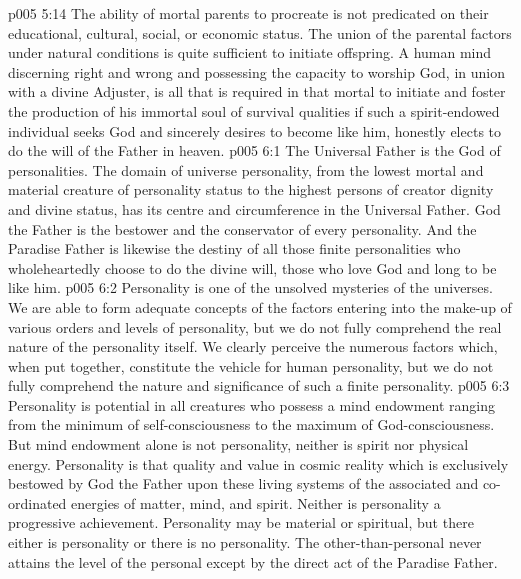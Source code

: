 \vs p005 5:14 The ability of mortal parents to procreate is not predicated on their educational, cultural, social, or economic status. The union of the parental factors under natural conditions is quite sufficient to initiate offspring. A human mind discerning right and wrong and possessing the capacity to worship God, in union with a divine Adjuster, is all that is required in that mortal to initiate and foster the production of his immortal soul of survival qualities if such a spirit\hyp{}endowed individual seeks God and sincerely desires to become like him, honestly elects to do the will of the Father in heaven.
\vs p005 6:1 The Universal Father is the God of personalities. The domain of universe personality, from the lowest mortal and material creature of personality status to the highest persons of creator dignity and divine status, has its centre and circumference in the Universal Father. God the Father is the bestower and the conservator of every personality. And the Paradise Father is likewise the destiny of all those finite personalities who wholeheartedly choose to do the divine will, those who love God and long to be like him.
\vs p005 6:2 \pc Personality is one of the unsolved mysteries of the universes. We are able to form adequate concepts of the factors entering into the make\hyp{}up of various orders and levels of personality, but we do not fully comprehend the real nature of the personality itself. We clearly perceive the numerous factors which, when put together, constitute the vehicle for human personality, but we do not fully comprehend the nature and significance of such a finite personality.
\vs p005 6:3 Personality is potential in all creatures who possess a mind endowment ranging from the minimum of self\hyp{}consciousness to the maximum of God\hyp{}consciousness. But mind endowment alone is not personality, neither is spirit nor physical energy. Personality is that quality and value in cosmic reality which is exclusively bestowed by God the Father upon these living systems of the associated and co\hyp{}ordinated energies of matter, mind, and spirit. Neither is personality a progressive achievement. Personality may be material or spiritual, but there either is personality or there is no personality. The other\hyp{}than\hyp{}personal never attains the level of the personal except by the direct act of the Paradise Father.
